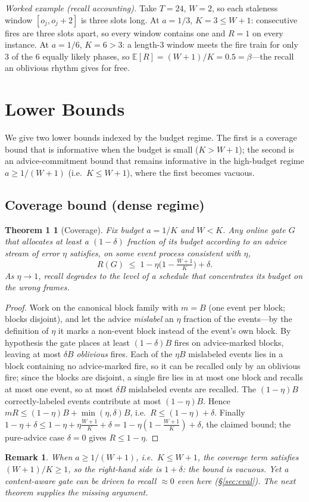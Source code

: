 ﻿\documentclass[lettersize,journal]{IEEEtran}
\newtheorem*{thmone}{Theorem 1}
\newtheorem*{rem}{Remark}
\begin{document}
\noindent\emph{Worked example (recall accounting).} Take $T{=}24$, $W{=}2$, so each staleness window $[o_j,o_j{+}2]$ is three slots long. At $a{=}1/3$, $K{=}3\le W{+}1$: consecutive fires are three slots apart, so every window contains one and $R{=}1$ on every instance. At $a{=}1/6$, $K{=}6>3$: a length-$3$ window meets the fire train for only $3$ of the $6$ equally likely phases, so $\mathbb E[R]=(W{+}1)/K=0.5=\beta$---the recall an oblivious rhythm gives for free.

\section{Lower Bounds}\label{sec:lb}
We give two lower bounds indexed by the budget regime. The first is a coverage bound that is informative when the budget is small ($K>W{+}1$); the second is an advice-commitment bound that remains informative in the high-budget regime $a\ge 1/(W{+}1)$ (i.e.\ $K\le W{+}1$), where the first becomes vacuous.

\subsection{Coverage bound (dense regime)}
\begin{thmone}[Coverage]
Fix budget $a=1/K$ and $W<K$. Any online gate $G$ that allocates at least a $(1-\delta)$ fraction of its budget according to an advice stream of error $\eta$ satisfies, on some event process consistent with $\eta$,
\begin{equation}
R(G)\;\le\;1-\eta\big(1-\tfrac{W+1}{K}\big)+\delta .
\end{equation}
As $\eta\to1$, recall degrades to the level of a schedule that concentrates its budget on the wrong frames.
\end{thmone}
\begin{proof}
Work on the canonical block family with $m=B$ (one event per block; blocks disjoint), and let the advice \emph{mislabel} an $\eta$ fraction of the events---by the definition of $\eta$ it marks a non-event block instead of the event's own block. By hypothesis the gate places at least $(1-\delta)B$ fires on advice-marked blocks, leaving at most $\delta B$ \emph{oblivious} fires. Each of the $\eta B$ mislabeled events lies in a block containing no advice-marked fire, so it can be recalled only by an oblivious fire; since the blocks are disjoint, a single fire lies in at most one block and recalls at most one event, so at most $\delta B$ mislabeled events are recalled. The $(1-\eta)B$ correctly-labeled events contribute at most $(1-\eta)B$. Hence $mR\le(1-\eta)B+\min(\eta,\delta)B$, i.e.\ $R\le(1-\eta)+\delta$. Finally $1-\eta+\delta\le 1-\eta+\eta\tfrac{W+1}{K}+\delta=1-\eta(1-\tfrac{W+1}{K})+\delta$, the claimed bound; the pure-advice case $\delta{=}0$ gives $R\le1-\eta$.
\end{proof}
\begin{rem}
When $a\ge 1/(W{+}1)$, i.e.\ $K\le W{+}1$, the coverage term satisfies $(W{+}1)/K\ge1$, so the right-hand side is $1+\delta$: the bound is \emph{vacuous}. Yet a content-aware gate can be driven to recall $\approx 0$ even here (\S\ref{sec:eval}). The next theorem supplies the missing argument.
\end{rem}
\end{document}
